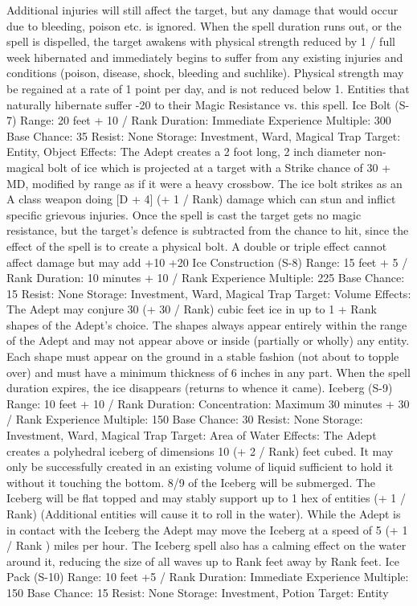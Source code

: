 \documentclass[a4paper]{article}
\begin{document}
\begin{multicols}{3}
Additional injuries will still affect the target, but
any damage that would occur due to bleeding,
poison etc. is ignored. When the spell duration runs
out, or the spell is dispelled, the target awakens
with physical strength reduced by 1 / full week
hibernated and immediately begins to suffer from
any existing injuries and conditions (poison, disease, shock, bleeding and suchlike). Physical
strength may be regained at a rate of 1 point per
day, and is not reduced below 1. Entities that naturally hibernate suffer -20 to their Magic Resistance
vs. this spell.
Ice Bolt (S-7)
Range: 20 feet + 10 / Rank
Duration: Immediate
Experience Multiple: 300
Base Chance: 35%
Resist: None
Storage: Investment, Ward, Magical Trap
Target: Entity, Object
Effects: The Adept creates a 2 foot long, 2 inch
diameter non-magical bolt of ice which is projected
at a target with a Strike chance of 30%
+ MD, modified by range as if it were a heavy
crossbow. The ice bolt strikes as an A class
weapon doing [D + 4] (+ 1 / Rank) damage which
can stun and inflict specific grievous injuries. Once
the spell is cast the target gets no magic resistance,
but the target’s defence is subtracted from the
chance to hit, since the effect of the spell is to
create a physical bolt. A double or triple effect
cannot affect damage but may add +10%
+20%
Ice Construction (S-8)
Range: 15 feet + 5 / Rank
Duration: 10 minutes + 10 / Rank
Experience Multiple: 225
Base Chance: 15%
Resist: None
Storage: Investment, Ward, Magical Trap
Target: Volume
Effects: The Adept may conjure 30 (+ 30 / Rank)
cubic feet ice in up to 1 + Rank shapes of the
Adept’s choice. The shapes always appear entirely
within the range of the Adept and may not appear
above or inside (partially or wholly) any entity.
Each shape must appear on the ground in a stable
fashion (not about to topple over) and must have a
minimum thickness of 6 inches in any part. When
the spell duration expires, the ice disappears (returns to whence it came).
Iceberg (S-9)
Range: 10 feet + 10 / Rank
Duration: Concentration: Maximum 30 minutes +
30 / Rank
Experience Multiple: 150
Base Chance: 30%
Resist: None
Storage: Investment, Ward, Magical Trap
Target: Area of Water
Effects: The Adept creates a polyhedral iceberg of
dimensions 10 (+ 2 / Rank) feet cubed. It may only
be successfully created in an existing volume of
liquid sufficient to hold it without it touching the
bottom. 8/9 of the Iceberg will be submerged. The
Iceberg will be flat topped and may stably support
up to 1 hex of entities (+ 1 / Rank) (Additional
entities will cause it to roll in the water). While the
Adept is in contact with the Iceberg the Adept may
move the Iceberg at a speed of 5 (+ 1 / Rank )
miles per hour. The Iceberg spell also has a calming effect on the water around it, reducing the size
of all waves up to Rank feet away by Rank feet.
Ice Pack (S-10)
Range: 10 feet +5 / Rank
Duration: Immediate
Experience Multiple: 150
Base Chance: 15%
Resist: None
Storage: Investment, Potion
Target: Entity


\end{multicols}
\end{document}
